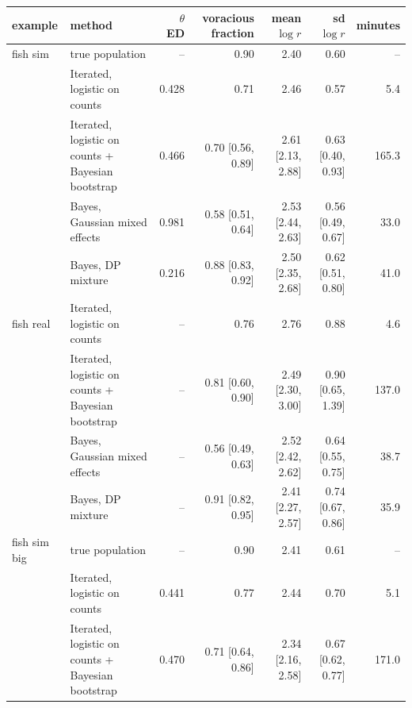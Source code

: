 \begin{tabular}{llrrrrr}
\toprule
example & method & $\theta$ ED & voracious fraction & mean $\log r$ & sd $\log r$ & minutes \\
\midrule
fish sim & true population & -- & 0.90 & 2.40 & 0.60 & -- \\
 & Iterated, logistic on counts & 0.428 & 0.71 & 2.46 & 0.57 & 5.4 \\
 & Iterated, logistic on counts + Bayesian bootstrap & 0.466 & 0.70 [0.56, 0.89] & 2.61 [2.13, 2.88] & 0.63 [0.40, 0.93] & 165.3 \\
 & Bayes, Gaussian mixed effects & 0.981 & 0.58 [0.51, 0.64] & 2.53 [2.44, 2.63] & 0.56 [0.49, 0.67] & 33.0 \\
 & Bayes, DP mixture & 0.216 & 0.88 [0.83, 0.92] & 2.50 [2.35, 2.68] & 0.62 [0.51, 0.80] & 41.0 \\ \addlinespace
fish real & Iterated, logistic on counts & -- & 0.76 & 2.76 & 0.88 & 4.6 \\
 & Iterated, logistic on counts + Bayesian bootstrap & -- & 0.81 [0.60, 0.90] & 2.49 [2.30, 3.00] & 0.90 [0.65, 1.39] & 137.0 \\
 & Bayes, Gaussian mixed effects & -- & 0.56 [0.49, 0.63] & 2.52 [2.42, 2.62] & 0.64 [0.55, 0.75] & 38.7 \\
 & Bayes, DP mixture & -- & 0.91 [0.82, 0.95] & 2.41 [2.27, 2.57] & 0.74 [0.67, 0.86] & 35.9 \\ \addlinespace
fish sim big & true population & -- & 0.90 & 2.41 & 0.61 & -- \\
 & Iterated, logistic on counts & 0.441 & 0.77 & 2.44 & 0.70 & 5.1 \\
 & Iterated, logistic on counts + Bayesian bootstrap & 0.470 & 0.71 [0.64, 0.86] & 2.34 [2.16, 2.58] & 0.67 [0.62, 0.77] & 171.0 \\
\bottomrule
\end{tabular}
